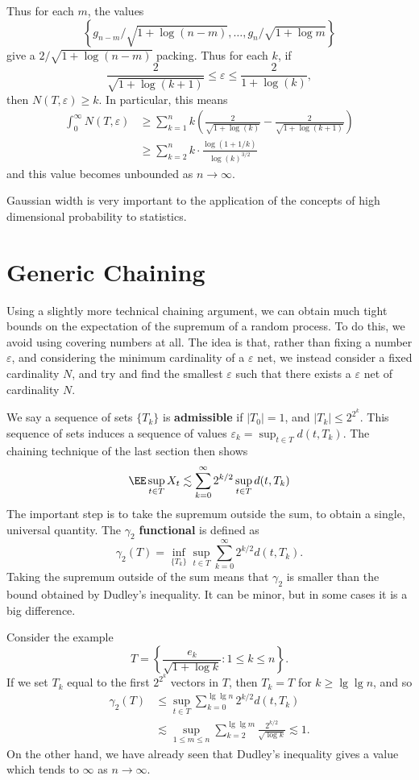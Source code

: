 \begin{example}
	Thus for each $m$, the values
	\[ \left\{ g_{n-m}/\sqrt{1 + \log(n-m)}, \dots, g_n/\sqrt{1 + \log m} \right \} \]
	give a $2/\sqrt{1 + \log(n-m)}$ packing. Thus for each $k$, if
	\[ \frac{2}{\sqrt{1 + \log(k+1)}} \leq \varepsilon \leq \frac{2}{1 + \log(k)}, \]
	then $N(T,\varepsilon) \geq k$. In particular, this means
	\begin{align*}
		\int_0^\infty N(T,\varepsilon) &\geq \sum_{k = 1}^n k \left( \frac{2}{\sqrt{1 + \log(k)}} - \frac{2}{\sqrt{1 + \log(k+1)}} \right)\\
		&\geq \sum_{k = 2}^n k \cdot \frac{\log(1 + 1/k)}{\log(k)^{3/2}}
	\end{align*}
	and this value becomes unbounded as $n \to \infty$.
\end{example}

Gaussian width is very important to the application of the concepts of high dimensional probability to statistics.

\section{Generic Chaining}

Using a slightly more technical chaining argument, we can obtain much tight bounds on the expectation of the supremum of a random process. To do this, we avoid using covering numbers at all. The idea is that, rather than fixing a number $\varepsilon$, and considering the minimum cardinality of a $\varepsilon$ net, we instead consider a fixed cardinality $N$, and try and find the smallest $\varepsilon$ such that there exists a $\varepsilon$ net of cardinality $N$.

We say a sequence of sets $\{ T_k \}$ is \textbf{admissible} if $|T_0| = 1$, and $|T_k| \leq 2^{2^k}$. This sequence of sets induces a sequence of values $\varepsilon_k = \sup_{t \in T} d(t,T_k)$. The chaining technique of the last section then shows
%
\[ \EE \sup_{t \in T} X_t \lesssim \sum_{k = 0}^\infty 2^{k/2} \sup_{t \in T} d(t,T_k) \]
%
The important step is to take the supremum outside the sum, to obtain a single, universal quantity. The $\gamma_2$ \textbf{functional} is defined as
%
\[ \gamma_2(T) = \inf_{\{ T_k \}} \sup_{t \in T} \sum_{k = 0}^\infty 2^{k/2} d(t,T_k). \]
%
Taking the supremum outside of the sum means that $\gamma_2$ is smaller than the bound obtained by Dudley's inequality. It can be minor, but in some cases it is a big difference.

\begin{example}
	Consider the example
	\[ T = \left\{ \frac{e_k}{\sqrt{1 + \log k}} : 1 \leq k \leq n \right\}. \]
	If we set $T_k$ equal to the first $2^{2^k}$ vectors in $T$, then $T_k = T$ for $k \geq \lg \lg n$, and so
	\begin{align*}
		\gamma_2(T) &\leq \sup_{t \in T} \sum_{k = 0}^{\lg \lg n} 2^{k/2} d(t,T_k)\\
		&\lesssim \sup_{1 \leq m \leq n} \sum_{k = 2}^{\lg \lg m} \frac{2^{k/2}}{\sqrt{\log k}} \lesssim 1.
	\end{align*}
	On the other hand, we have already seen that Dudley's inequality gives a value which tends to $\infty$ as $n \to \infty$.
\end{example}

